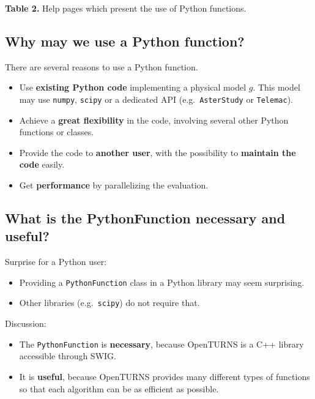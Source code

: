 \documentclass[11pt]{article}
\providecommand{\tightlist}{%
      \setlength{\itemsep}{0pt}\setlength{\parskip}{0pt}}
\begin{document}
\textbf{Table 2.} Help pages which present the use of Python functions.

    \hypertarget{why-may-we-use-a-python-function}{%
\subsection{Why may we use a Python
function?}\label{why-may-we-use-a-python-function}}

There are several reasons to use a Python function.

\begin{itemize}
\tightlist
\item
  Use \textbf{existing Python code} implementing a physical model \(g\).
  This model may use \texttt{numpy}, \texttt{scipy} or a dedicated API
  (e.g.~\texttt{AsterStudy} or \texttt{Telemac}).
\item
  Achieve a \textbf{great flexibility} in the code, involving several
  other Python functions or classes.
\item
  Provide the code to \textbf{another user}, with the possibility to
  \textbf{maintain the code} easily.
\item
  Get \textbf{performance} by parallelizing the evaluation.
\end{itemize}

    \hypertarget{what-is-the-pythonfunction-necessary-and-useful}{%
\subsection{What is the PythonFunction necessary and
useful?}\label{what-is-the-pythonfunction-necessary-and-useful}}

Surprise for a Python user:

\begin{itemize}
\tightlist
\item
  Providing a \texttt{PythonFunction} class in a Python library may seem
  surprising.
\item
  Other libraries (e.g.~\texttt{scipy}) do not require that.
\end{itemize}

Discussion:

\begin{itemize}
\tightlist
\item
  The \texttt{PythonFunction} is \textbf{necessary}, because OpenTURNS
  is a C++ library accessible through SWIG.
\item
  It is \textbf{useful}, because OpenTURNS provides many different types
  of functions so that each algorithm can be as efficient as possible.
\end{itemize}
\end{document}
